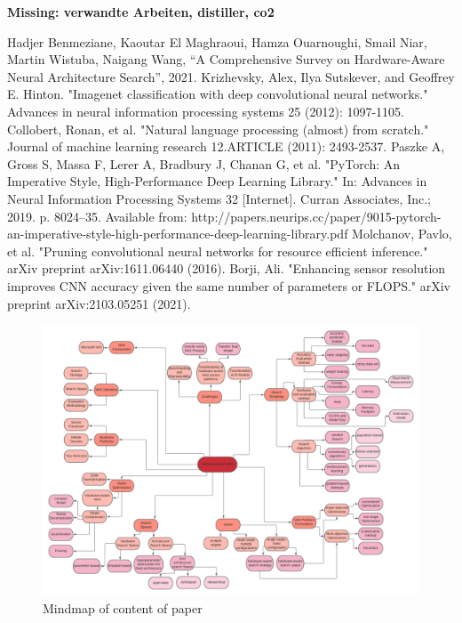 \documentclass[conference]{IEEEtran}
\begin{document}
\textbf{Missing: verwandte Arbeiten, distiller, co2}

\begin{thebibliography}{00}
 Hadjer Benmeziane, Kaoutar El Maghraoui, Hamza Ouarnoughi, Smail Niar, Martin Wistuba, Naigang Wang, ``A Comprehensive Survey on Hardware-Aware Neural Architecture Search'', 2021.
 Krizhevsky, Alex, Ilya Sutskever, and Geoffrey E. Hinton. "Imagenet classification with deep convolutional neural networks." Advances in neural information processing systems 25 (2012): 1097-1105.
 Collobert, Ronan, et al. "Natural language processing (almost) from scratch." Journal of machine learning research 12.ARTICLE (2011): 2493-2537.
 Paszke A, Gross S, Massa F, Lerer A, Bradbury J, Chanan G, et al. "PyTorch: An Imperative Style, High-Performance Deep Learning Library." In: Advances in Neural Information Processing Systems 32 [Internet]. Curran Associates, Inc.; 2019. p. 8024–35. Available from: http://papers.neurips.cc/paper/9015-pytorch-an-imperative-style-high-performance-deep-learning-library.pdf
 Molchanov, Pavlo, et al. "Pruning convolutional neural networks for resource efficient inference." arXiv preprint arXiv:1611.06440 (2016).
 Borji, Ali. "Enhancing sensor resolution improves CNN accuracy given the same number of parameters or FLOPS." arXiv preprint arXiv:2103.05251 (2021).
\end{thebibliography}

\begin{figure}[htbp]
\includegraphics[width=\paperwidth, angle =90]{harware-awareNAS.png}
\caption{Mindmap of content of paper}
\label{fig:Mindmap}
\end{figure} 
\end{document}
